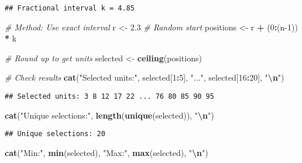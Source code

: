 \documentclass[
]{article}
\newenvironment{Shaded}{\begin{snugshade}}{\end{snugshade}}
\newcommand{\CommentTok}[1]{\textcolor[rgb]{0.56,0.35,0.01}{\textit{#1}}}
\newcommand{\DecValTok}[1]{\textcolor[rgb]{0.00,0.00,0.81}{#1}}
\newcommand{\FloatTok}[1]{\textcolor[rgb]{0.00,0.00,0.81}{#1}}
\newcommand{\FunctionTok}[1]{\textcolor[rgb]{0.13,0.29,0.53}{\textbf{#1}}}
\newcommand{\NormalTok}[1]{#1}
\newcommand{\OtherTok}[1]{\textcolor[rgb]{0.56,0.35,0.01}{#1}}
\newcommand{\SpecialCharTok}[1]{\textcolor[rgb]{0.81,0.36,0.00}{\textbf{#1}}}
\newcommand{\StringTok}[1]{\textcolor[rgb]{0.31,0.60,0.02}{#1}}
\begin{document}
\begin{verbatim}
## Fractional interval k = 4.85
\end{verbatim}

\begin{Shaded}
\begin{Highlighting}[]
\CommentTok{\# Method: Use exact interval}
\NormalTok{r }\OtherTok{\textless{}{-}} \FloatTok{2.3}  \CommentTok{\# Random start}
\NormalTok{positions }\OtherTok{\textless{}{-}}\NormalTok{ r }\SpecialCharTok{+}\NormalTok{ (}\DecValTok{0}\SpecialCharTok{:}\NormalTok{(n}\DecValTok{{-}1}\NormalTok{)) }\SpecialCharTok{*}\NormalTok{ k}

\CommentTok{\# Round up to get units}
\NormalTok{selected }\OtherTok{\textless{}{-}} \FunctionTok{ceiling}\NormalTok{(positions)}

\CommentTok{\# Check results}
\FunctionTok{cat}\NormalTok{(}\StringTok{"Selected units:"}\NormalTok{, selected[}\DecValTok{1}\SpecialCharTok{:}\DecValTok{5}\NormalTok{], }\StringTok{"..."}\NormalTok{, }
\NormalTok{    selected[}\DecValTok{16}\SpecialCharTok{:}\DecValTok{20}\NormalTok{], }\StringTok{"}\SpecialCharTok{\textbackslash{}n}\StringTok{"}\NormalTok{)}
\end{Highlighting}
\end{Shaded}

\begin{verbatim}
## Selected units: 3 8 12 17 22 ... 76 80 85 90 95
\end{verbatim}

\begin{Shaded}
\begin{Highlighting}[]
\FunctionTok{cat}\NormalTok{(}\StringTok{"Unique selections:"}\NormalTok{, }\FunctionTok{length}\NormalTok{(}\FunctionTok{unique}\NormalTok{(selected)), }\StringTok{"}\SpecialCharTok{\textbackslash{}n}\StringTok{"}\NormalTok{)}
\end{Highlighting}
\end{Shaded}

\begin{verbatim}
## Unique selections: 20
\end{verbatim}

\begin{Shaded}
\begin{Highlighting}[]
\FunctionTok{cat}\NormalTok{(}\StringTok{"Min:"}\NormalTok{, }\FunctionTok{min}\NormalTok{(selected), }\StringTok{"Max:"}\NormalTok{, }\FunctionTok{max}\NormalTok{(selected), }\StringTok{"}\SpecialCharTok{\textbackslash{}n}\StringTok{"}\NormalTok{)}
\end{Highlighting}
\end{Shaded}
\end{document}
